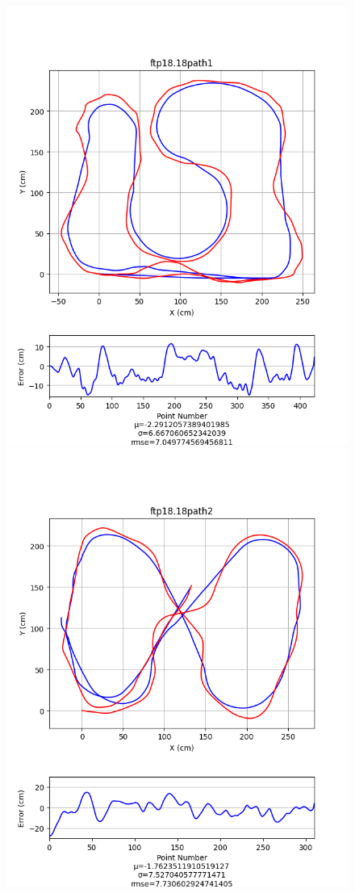\documentclass[mla7]{mla}
\begin{document}
\begin{paper}
\begin{figure}[H]
\includegraphics[width=\linewidth]{pathData/ftppath1}
\endminipage\hfill
{}
\includegraphics[width=\linewidth]{pathData/ftppath2}

\end{figure}
\end{paper}
\end{document}
